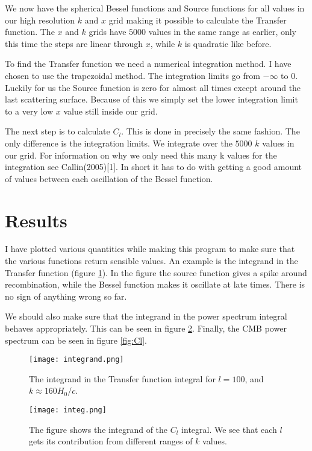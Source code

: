 \documentclass[a4paper]{report}
\begin{document}
We now have the spherical Bessel functions and Source functions for all values in our high resolution $k$ and $x$ grid making it possible to calculate the Transfer function. The $x$ and $k$ grids have $5000$ values in the same range as earlier, only this time the steps are linear through $x$, while $k$ is quadratic like before.

To find the Transfer function we need a numerical integration method. I have chosen to use the trapezoidal method. The integration limits go from $-\infty$ to $0$. Luckily for us the Source function is zero for almost all times except around the last scattering surface. Because of this we simply set the lower integration limit to a very low $x$ value still inside our grid.

The next step is to calculate $C_l$. This is done in precisely the same fashion. The only difference is the integration limits. We integrate over the $5000$ $k$ values in our grid. For information on why we only need this many k values for the integration see Callin(2005)[1]. In short it has to do with getting a good amount of values between each oscillation of the  Bessel function. 

\section{Results}\label{sec:results}
I have plotted various quantities while making this program to make sure that the various functions return sensible values.
An example is the integrand in the Transfer function (figure \ref{fig:integrand}). In the figure the source function gives a spike around recombination, while the Bessel function makes it oscillate at late times. There is no sign of anything wrong so far.

We should also make sure that the integrand in the power spectrum integral behaves appropriately. This can be seen in figure \ref{fig:integ}. Finally, the CMB power spectrum can be seen in figure \ref{fig:Cl}.

\begin{figure}[H]
 \texttt{[image: integrand.png]}
 \caption{The integrand in the Transfer function integral for $l= 100$, and $k \approx160H_0/c$.}
 \label{fig:integrand}
\end{figure}

\begin{figure}[ht]
 \texttt{[image: integ.png]}
 \caption{The figure shows the integrand of the $C_l$ integral. We see that each $l$ gets its contribution from different ranges of $k$ values.}
 \label{fig:integ}
\end{figure}
\end{document}
